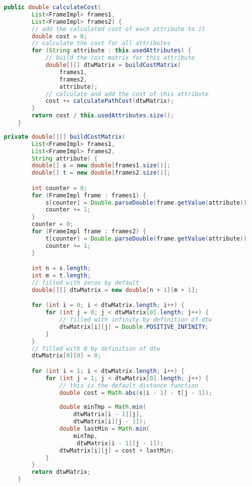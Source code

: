 \begin{lstlisting}[language=Java, caption=Berechnung der Kosten.]
    public double calculateCost(
        List<FrameImpl> frames1,
        List<FrameImpl> frames2) {
        // add the calculated cost of each attribute to it
        double cost = 0;
        // calculate the cost for all attributes
        for (String attribute : this.usedAttributes) {
            // build the cost matrix for this attribute
            double[][] dtwMatrix = buildCostMatrix(
                frames1,
                frames2,
                attribute);
            // calculate and add the cost of this attribute
            cost += calculatePathCost(dtwMatrix);
        }
        return cost / this.usedAttributes.size();
    }
\end{lstlisting}


\begin{lstlisting}[language=Java, caption=Kostenmatrix.]
    private double[][] buildCostMatrix(
        List<FrameImpl> frames1,
        List<FrameImpl> frames2,
        String attribute) {
        double[] s = new double[frames1.size()];
        double[] t = new double[frames2.size()];

        int counter = 0;
        for (FrameImpl frame : frames1) {
            s[counter] = Double.parseDouble(frame.getValue(attribute));
            counter += 1;
        }
        counter = 0;
        for (FrameImpl frame : frames2) {
            t[counter] = Double.parseDouble(frame.getValue(attribute));
            counter += 1;
        }

        int n = s.length;
        int m = t.length;
        // filled with zeros by default
        double[][] dtwMatrix = new double[n + 1][m + 1];

        for (int i = 0; i < dtwMatrix.length; i++) {
            for (int j = 0; j < dtwMatrix[0].length; j++) {
                // filled with infinity by definition of dtw
                dtwMatrix[i][j] = Double.POSITIVE_INFINITY;
            }
        }
        // filled with 0 by definition of dtw
        dtwMatrix[0][0] = 0;

        for (int i = 1; i < dtwMatrix.length; i++) {
            for (int j = 1; j < dtwMatrix[0].length; j++) {
                // this is the default distance function
                double cost = Math.abs(s[i - 1] - t[j - 1]);
                
                double minTmp = Math.min(
                    dtwMatrix[i - 1][j],
                    dtwMatrix[i][j - 1]);
                double lastMin = Math.min(
                    minTmp,
                     dtwMatrix[i - 1][j - 1]);
                dtwMatrix[i][j] = cost + lastMin;
            }
        }
        return dtwMatrix;
    }
\end{lstlisting}

